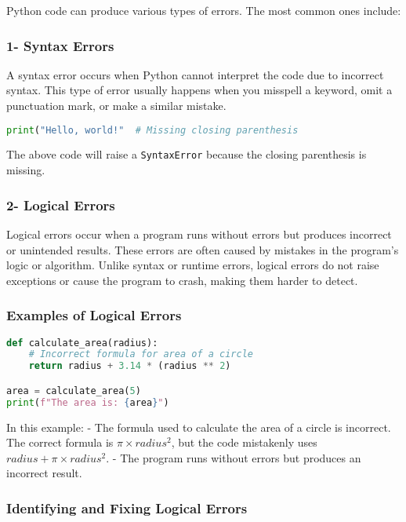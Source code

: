 Python code can produce various types of errors. The most common ones include:

\subsubsection{1- Syntax Errors}

A syntax error occurs when Python cannot interpret the code due to incorrect syntax. This type of error usually happens when you misspell a keyword, omit a punctuation mark, or make a similar mistake.

\begin{lstlisting}[language=Python, caption=Syntax Error Example]
print("Hello, world!"  # Missing closing parenthesis
\end{lstlisting}

The above code will raise a \texttt{SyntaxError} because the closing parenthesis is missing.

\subsubsection{2- Logical Errors}

Logical errors occur when a program runs without errors but produces incorrect or unintended results. These errors are often caused by mistakes in the program’s logic or algorithm. Unlike syntax or runtime errors, logical errors do not raise exceptions or cause the program to crash, making them harder to detect.

\subsubsection{Examples of Logical Errors}

\begin{lstlisting}[language=Python, caption=Logical Error Example]
def calculate_area(radius):
    # Incorrect formula for area of a circle
    return radius + 3.14 * (radius ** 2)

area = calculate_area(5)
print(f"The area is: {area}")
\end{lstlisting}

In this example:
- The formula used to calculate the area of a circle is incorrect. The correct formula is \( \pi \times radius^2 \), but the code mistakenly uses \( radius + \pi \times radius^2 \). 
- The program runs without errors but produces an incorrect result.

\subsubsection{Identifying and Fixing Logical Errors}

